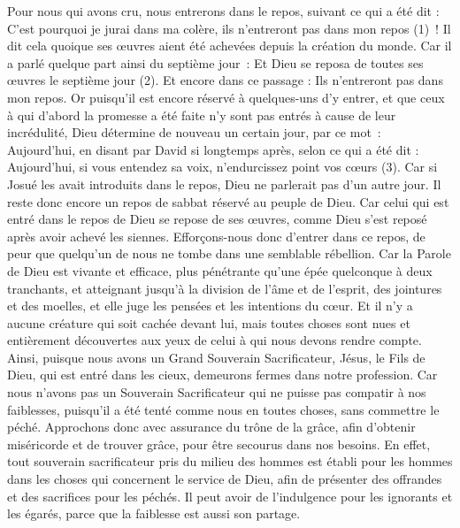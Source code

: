 \begin{multicols}{2}
Pour nous qui avons cru, nous entrerons dans le repos, suivant ce qui a été dit : C'est pourquoi je jurai dans ma colère, ils n’entreront pas dans mon repos (1) ! Il dit cela quoique ses œuvres aient été achevées depuis la création du monde.
Car il a parlé quelque part ainsi du septième jour : Et Dieu se reposa de toutes ses œuvres le septième jour (2).
Et encore dans ce passage : Ils n’entreront pas dans mon repos.
Or puisqu’il est encore réservé à quelques-uns d’y entrer, et que ceux à qui d’abord la promesse a été faite n’y sont pas entrés à cause de leur incrédulité,
Dieu détermine de nouveau un certain jour, par ce mot : Aujourd'hui, en disant par David si longtemps après, selon ce qui a été dit : Aujourd'hui, si vous entendez sa voix, n'endurcissez point vos cœurs (3).
Car si Josué les avait introduits dans le repos, Dieu ne parlerait pas d'un autre jour.
Il reste donc encore un repos de sabbat réservé au peuple de Dieu.
Car celui qui est entré dans le repos de Dieu se repose de ses œuvres, comme Dieu s’est reposé après avoir achevé les siennes.
Efforçons-nous donc d'entrer dans ce repos, de peur que quelqu'un de nous ne tombe dans une semblable rébellion.
Car la Parole de Dieu est vivante et efficace, plus pénétrante qu’une épée quelconque à deux tranchants, et atteignant jusqu’à la division de l'âme et de l'esprit, des jointures et des moelles, et elle juge les pensées et les intentions du cœur.
Et il n'y a aucune créature qui soit cachée devant lui, mais toutes choses sont nues et entièrement découvertes aux yeux de celui à qui nous devons rendre compte.
Ainsi, puisque nous avons un Grand Souverain Sacrificateur, Jésus, le Fils de Dieu, qui est entré dans les cieux, demeurons fermes dans notre profession.
Car nous n'avons pas un Souverain Sacrificateur qui ne puisse pas compatir à nos faiblesses, puisqu’il a été tenté comme nous en toutes choses, sans commettre le péché.
Approchons donc avec assurance du trône de la grâce, afin d’obtenir miséricorde et de trouver grâce, pour être secourus dans nos besoins.
\VerseOne{}En effet, tout souverain sacrificateur pris du milieu des hommes est établi pour les hommes dans les choses qui concernent le service de Dieu, afin de présenter des offrandes et des sacrifices pour les péchés.
Il peut avoir de l’indulgence pour les ignorants et les égarés, parce que la faiblesse est aussi son partage.

\end{multicols}

